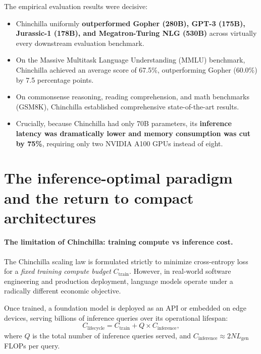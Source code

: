 \documentclass[../../main.tex]{subfiles}
\begin{document}
The empirical evaluation results were decisive:
\begin{itemize}
    \item Chinchilla uniformly \textbf{outperformed Gopher (280B), GPT-3 (175B), Jurassic-1 (178B), and Megatron-Turing NLG (530B)} across virtually every downstream evaluation benchmark.
    \item On the Massive Multitask Language Understanding (MMLU) benchmark, Chinchilla achieved an average score of 67.5\%, outperforming Gopher (60.0\%) by 7.5 percentage points.
    \item On commonsense reasoning, reading comprehension, and math benchmarks (GSM8K), Chinchilla established comprehensive state-of-the-art results.
    \item Crucially, because Chinchilla had only 70B parameters, its \textbf{inference latency was dramatically lower and memory consumption was cut by 75\%}, requiring only two NVIDIA A100 GPUs instead of eight.
\end{itemize}

\section{The inference-optimal paradigm and the return to compact architectures}
\label{sec:inference_optimal_paradigm}

\paragraph{The limitation of Chinchilla: training compute vs inference cost.}
The Chinchilla scaling law is formulated strictly to minimize cross-entropy loss for a \emph{fixed training compute budget} $C_{\text{train}}$. However, in real-world software engineering and production deployment, language models operate under a radically different economic objective.

Once trained, a foundation model is deployed as an API or embedded on edge devices, serving billions of inference queries over its operational lifespan:
\begin{equation}
\label{eq:total_lifecycle_compute}
C_{\text{lifecycle}} = C_{\text{train}} + Q \times C_{\text{inference}},
\end{equation}
where $Q$ is the total number of inference queries served, and $C_{\text{inference}} \approx 2 N L_{\text{gen}}$ FLOPs per query.
\end{document}
